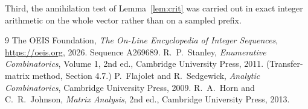 \documentclass[11pt,a4paper]{article}
\theoremstyle{plain}
\theoremstyle{definition}
\begin{document}
Third, the annihilation test of Lemma~\ref{lem:crit} was carried out in exact integer
arithmetic on the whole vector rather than on a sampled prefix.

\begin{thebibliography}{9}
 The OEIS Foundation, \emph{The On-Line Encyclopedia of Integer
Sequences}, \url{https://oeis.org}, 2026. Sequence A269689.
 R.~P.~Stanley, \emph{Enumerative Combinatorics}, Volume 1, 2nd ed.,
Cambridge University Press, 2011. (Transfer-matrix method, Section 4.7.)
 P.~Flajolet and R.~Sedgewick, \emph{Analytic Combinatorics}, Cambridge
University Press, 2009.
 R.~A.~Horn and C.~R.~Johnson, \emph{Matrix Analysis}, 2nd ed., Cambridge
University Press, 2013.
\end{thebibliography}
\end{document}
